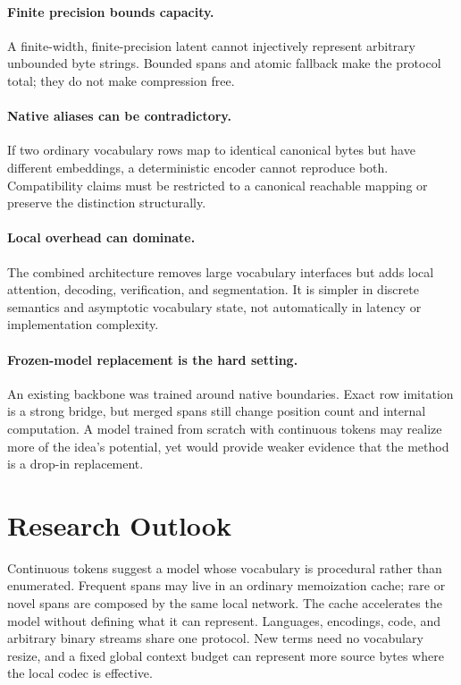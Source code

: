 \documentclass[10pt,twocolumn]{article}
\begin{document}
\paragraph{Finite precision bounds capacity.}
A finite-width, finite-precision latent cannot injectively represent arbitrary unbounded byte
strings. Bounded spans and atomic fallback make the protocol total; they do not make compression
free.

\paragraph{Native aliases can be contradictory.}
If two ordinary vocabulary rows map to identical canonical bytes but have different embeddings, a
deterministic encoder cannot reproduce both. Compatibility claims must be restricted to a
canonical reachable mapping or preserve the distinction structurally.

\paragraph{Local overhead can dominate.}
The combined architecture removes large vocabulary interfaces but adds local attention, decoding,
verification, and segmentation. It is simpler in discrete semantics and asymptotic vocabulary
state, not automatically in latency or implementation complexity.

\paragraph{Frozen-model replacement is the hard setting.}
An existing backbone was trained around native boundaries. Exact row imitation is a strong bridge,
but merged spans still change position count and internal computation. A model trained from scratch
with continuous tokens may realize more of the idea's potential, yet would provide weaker evidence
that the method is a drop-in replacement.

\section{Research Outlook}

Continuous tokens suggest a model whose vocabulary is procedural rather than enumerated. Frequent
spans may live in an ordinary memoization cache; rare or novel spans are composed by the same local
network. The cache accelerates the model without defining what it can represent. Languages,
encodings, code, and arbitrary binary streams share one protocol. New terms need no vocabulary
resize, and a fixed global context budget can represent more source bytes where the local codec is
effective.
\end{document}
